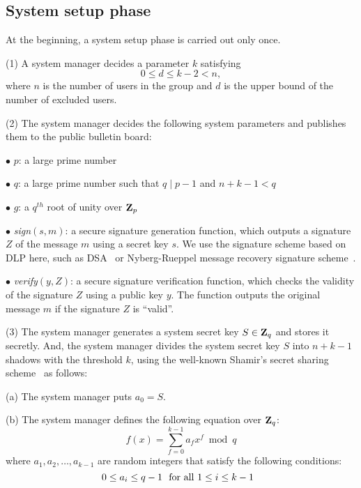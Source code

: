 \documentclass{ims9x6}
\begin{document}
\subsection{System setup phase}
At the beginning, a system setup phase is carried out only once.
\begin{arabiclist}[(2)]
\item[(1)] A system manager decides a parameter $k$ satisfying
\[ 0\leq d\leq k-2<n, \]
where $n$ is the number of users in the group and $d$ is the upper
bound of the number of excluded users.
\item[(2)] The system manager decides the following system parameters
and publishes them to the public bulletin board:
\begin{itemlist}[$\bullet$]
\item[$\bullet$] $p$: a large prime number
\item[$\bullet$] $q$: a large prime number such that $q\mid p-1$ and
$n+k-1<q$
\item[$\bullet$] $g$: a $q^{th}$ root of unity over ${\bf Z}_p$
\item[$\bullet$] {\it sign}$(s,m)$: a secure signature generation
function, which outputs a signature $Z$ of the message
$m$ using a secret key $s$. We use the signature scheme based on
DLP here, such as
DSA~\cite{kn:DSA} or Nyberg-Rueppel message recovery signature
scheme~\cite{kn:NR}.
\item[$\bullet$] {\it verify}$(y,Z)$: a secure signature verification
function, which checks the validity of the signature $Z$ using a
public key $y$. The function outputs the original message $m$ if the
signature $Z$ is ``valid''.
\end{itemlist}
\item[(3)] The system manager generates a system secret key
$S\in {\bf Z}_q$ and stores it secretly. And, the system manager
divides the system secret key $S$ into $n+k-1$ shadows
with the threshold $k$, using the well-known Shamir's secret
sharing scheme~\cite{kn:S} as follows:
\begin{alphlist}[(b)]
\item[(a)] The system manager puts $a_0=S$.
\item[(b)] The system manager defines the following equation over ${\bf
Z}_q$:
\begin{equation}	%
f(x)=\sum_{f=0}^{k-1} a_fx^f\bmod q
\end{equation}
where $a_1,a_2,\ldots,a_{k-1}$ are random integers that satisfy the
following conditions:
\[
0\leq a_i\leq q-1\ \ {\rm for\ all\ } 1\leq i\leq k-1\ \
\]
\end{alphlist}
\end{arabiclist}
\end{document}
